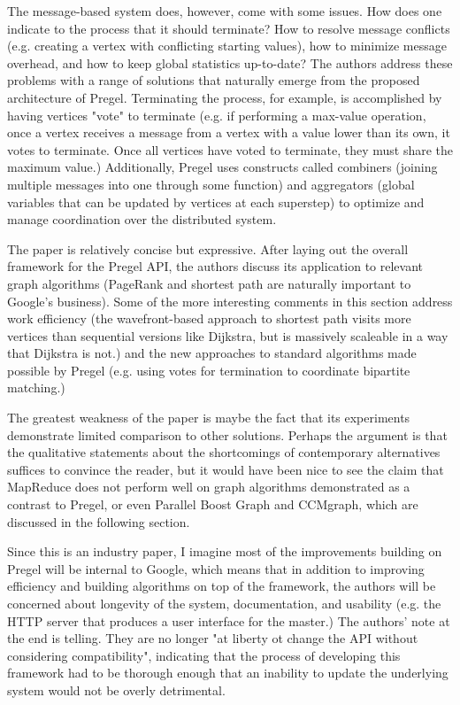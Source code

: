 The message-based system does, however, come with some issues. How does one indicate to the process that it should terminate? How to resolve message conflicts (e.g. creating a vertex with conflicting starting values), how to minimize message overhead, and how to keep global statistics up-to-date? The authors address these problems with a range of solutions that naturally emerge from the proposed architecture of Pregel. Terminating the process, for example, is accomplished by having vertices "vote" to terminate (e.g. if performing a max-value operation, once a vertex receives a message from a vertex with a value lower than its own, it votes to terminate. Once all vertices have voted to terminate, they must share the maximum value.) Additionally, Pregel uses constructs called combiners (joining multiple messages into one through some function) and aggregators (global variables that can be updated by vertices at each superstep) to optimize and manage coordination over the distributed system.

The paper is relatively concise but expressive. After laying out the overall framework for the Pregel API, the authors discuss its application to relevant graph algorithms (PageRank and shortest path are naturally important to Google's business). Some of the more interesting comments in this section address work efficiency (the wavefront-based approach to shortest path visits more vertices than sequential versions like Dijkstra, but is massively scaleable in a way that Dijkstra is not.) and the new approaches to standard algorithms made possible by Pregel (e.g. using votes for termination to coordinate bipartite matching.)

The greatest weakness of the paper is maybe the fact that its experiments demonstrate limited comparison to other solutions. Perhaps the argument is that the qualitative statements about the shortcomings of contemporary alternatives suffices to convince the reader, but it would have been nice to see the claim that MapReduce does not perform well on graph algorithms demonstrated as a contrast to Pregel, or even Parallel Boost Graph and CCMgraph, which are discussed in the following section. 

Since this is an industry paper, I imagine most of the improvements building on Pregel will be internal to Google, which means that in addition to improving efficiency and building algorithms on top of the framework, the authors will be concerned about longevity of the system, documentation, and usability (e.g. the HTTP server that produces a user interface for the master.) The authors' note at the end is telling. They are no longer "at liberty ot change the API without considering compatibility", indicating that the process of developing this framework had to be thorough enough that an inability to update the underlying system would not be overly detrimental.
